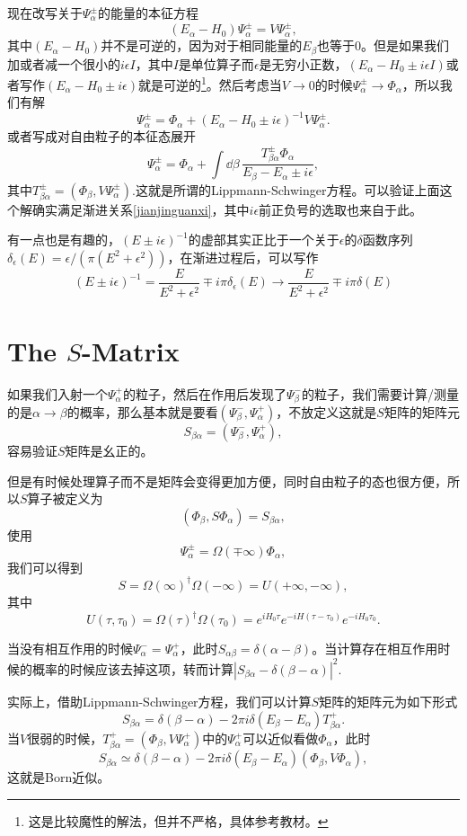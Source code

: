 现在改写关于$\Psi_\alpha^\pm$的能量的本征方程
\[
(E_\alpha-H_0)\Psi_\alpha^\pm=V\Psi_\alpha^\pm,
\]
其中$(E_\alpha-H_0)$并不是可逆的，因为对于相同能量的$E_\beta$也等于0。但是如果我们加或者减一个很小的$i\epsilon I$，其中$I$是单位算子而$\epsilon$是无穷小正数，$(E_\alpha-H_0\pm i\epsilon I)$或者写作$(E_\alpha-H_0\pm i\epsilon)$就是可逆的\footnote{这是比较魔性的解法，但并不严格，具体参考教材。}。然后考虑当$V\to 0$的时候$\Psi_\alpha^\pm \to \Phi_\alpha$，所以我们有解
\[
\Psi_\alpha^\pm=\Phi_\alpha+(E_\alpha-H_0\pm i\epsilon)^{-1}V\Psi_\alpha^\pm.
\]
或者写成对自由粒子的本征态展开
\[
\Psi_\alpha^\pm=\Phi_\alpha+\int \dd \beta \,\frac{T^\pm_{\beta\alpha}\Phi_\alpha}{E_\beta-E_\alpha\pm i\epsilon},
\]
其中$T^\pm_{\beta\alpha}=(\Phi_\beta,V\Psi_\alpha^\pm)$.这就是所谓的Lippmann-Schwinger方程。可以验证上面这个解确实满足渐进关系\eqref{jianjinguanxi}，其中$i\epsilon$前正负号的选取也来自于此。

有一点也是有趣的，$(E\pm i\epsilon)^{-1}$的虚部其实正比于一个关于$\epsilon$的$\delta$函数序列$\delta_{\epsilon}(E)=\epsilon/(\pi(E^2+\epsilon^2))$，在渐进过程后，可以写作
\[
(E\pm i\epsilon)^{-1}=\frac{E}{E^2+\epsilon^2}\mp i \pi \delta_{\epsilon}(E)\to \frac{E}{E^2+\epsilon^2}\mp i \pi \delta(E)
\]

\section{The $S$-Matrix}
如果我们入射一个$\Psi_\alpha^+$的粒子，然后在作用后发现了$\Psi_\beta^-$的粒子，我们需要计算/测量的是$\alpha \to \beta$的概率，那么基本就是要看$(\Psi_\beta^-,\Psi_\alpha^+)$，不放定义这就是$S$矩阵的矩阵元
\[
	S_{\beta\alpha}=\left(\Psi_\beta^-,\Psi_\alpha^+\right),
\]
容易验证$S$矩阵是幺正的。

但是有时候处理算子而不是矩阵会变得更加方便，同时自由粒子的态也很方便，所以$S$算子被定义为
\[(\Phi_\beta,S\Phi_\alpha)=S_{\beta\alpha},
\]
使用\[
\Psi_\alpha^\pm=\Omega(\mp \infty)\Phi_\alpha,
\]我们可以得到
\[S=\Omega(\infty)^\dag \Omega(-\infty)=U(+\infty,-\infty),
\]
其中\[U(\tau,\tau_0)=\Omega(\tau)^\dag \Omega(\tau_0)=e^{iH_0\tau}e^{-iH(\tau-\tau_0)}e^{-iH_0\tau_0}.\]

当没有相互作用的时候$\Psi_\alpha^-=\Psi_\alpha^+$，此时$S_{\alpha\beta}=\delta(\alpha-\beta)$。当计算存在相互作用时候的概率的时候应该去掉这项，转而计算$|S_{\beta\alpha}-\delta(\beta-\alpha)|^2$.

实际上，借助Lippmann-Schwinger方程，我们可以计算$S$矩阵的矩阵元为如下形式
\[
S_{\beta\alpha}=\delta(\beta-\alpha)-2\pi i\delta(E_\beta-E_\alpha)T^+_{\beta\alpha}.
\]
当$V$很弱的时候，$T^+_{\beta\alpha}=(\Phi_\beta,V\Psi^+_\alpha)$中的$\Psi^+_\alpha$可以近似看做$\Phi_\alpha$，此时
\[
S_{\beta\alpha}\simeq\delta(\beta-\alpha)-2\pi i\delta(E_\beta-E_\alpha)(\Phi_\beta,V\Phi_\alpha),
\]
这就是Born近似。

